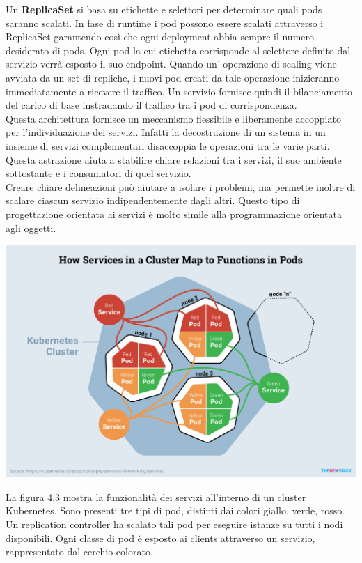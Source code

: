 \documentclass[12pt, a4paper]{report}
\begin{document}
Un \textbf{ReplicaSet} si basa su etichette e selettori per determinare quali pods saranno scalati. In fase di runtime i pod possono essere scalati attraverso i ReplicaSet garantendo così che ogni deployment abbia sempre il numero desiderato di pods. Ogni pod la cui etichetta corrisponde al selettore definito dal servizio verrà esposto il suo endpoint. Quando un' operazione di scaling viene avviata da un set di repliche, i nuovi pod creati da tale operazione inizieranno immediatamente a ricevere il traffico. Un servizio fornisce quindi il bilanciamento del carico di base instradando il traffico tra i pod di corrispondenza.
\\
Questa architettura fornisce un meccanismo flessibile e liberamente accoppiato per l'individuazione dei servizi. Infatti la decostruzione di un sistema in un insieme di servizi complementari disaccoppia le operazioni tra le varie parti. Questa astrazione aiuta a stabilire chiare relazioni tra i servizi, il suo ambiente sottostante e i consumatori di quel servizio.\\
Creare chiare delineazioni può aiutare a isolare i problemi, ma permette inoltre di scalare ciascun servizio indipendentemente dagli altri. Questo tipo di progettazione orientata ai servizi è molto simile alla programmazione orientata agli oggetti.
\begin{center}
  \includegraphics[width=\linewidth]{Images/Kubernetes-service}
\end{center}
La figura 4.3 mostra la funzionalità dei servizi all'interno di un cluster Kubernetes. Sono presenti tre tipi di pod, distinti dai colori giallo, verde, rosso. Un replication controller ha scalato tali pod per eseguire istanze su tutti i nodi disponibili. Ogni classe di pod è esposto ai clients attraverso un servizio, rappresentato dal cerchio colorato.\\
\end{document}
